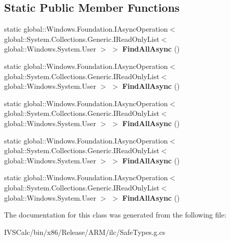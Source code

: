 \subsection*{Static Public Member Functions}
\begin{DoxyCompactItemize}
\item 
\mbox{\label{class_windows_1_1_system_1_1_user_a5108918689ee4c7c0de8959812335c4a}} 
static global\+::\+Windows.\+Foundation.\+I\+Async\+Operation$<$ global\+::\+System.\+Collections.\+Generic.\+I\+Read\+Only\+List$<$ global\+::\+Windows.\+System.\+User $>$ $>$ {\bfseries Find\+All\+Async} ()
\item 
\mbox{\label{class_windows_1_1_system_1_1_user_a5108918689ee4c7c0de8959812335c4a}} 
static global\+::\+Windows.\+Foundation.\+I\+Async\+Operation$<$ global\+::\+System.\+Collections.\+Generic.\+I\+Read\+Only\+List$<$ global\+::\+Windows.\+System.\+User $>$ $>$ {\bfseries Find\+All\+Async} ()
\item 
\mbox{\label{class_windows_1_1_system_1_1_user_a5108918689ee4c7c0de8959812335c4a}} 
static global\+::\+Windows.\+Foundation.\+I\+Async\+Operation$<$ global\+::\+System.\+Collections.\+Generic.\+I\+Read\+Only\+List$<$ global\+::\+Windows.\+System.\+User $>$ $>$ {\bfseries Find\+All\+Async} ()
\item 
\mbox{\label{class_windows_1_1_system_1_1_user_a5108918689ee4c7c0de8959812335c4a}} 
static global\+::\+Windows.\+Foundation.\+I\+Async\+Operation$<$ global\+::\+System.\+Collections.\+Generic.\+I\+Read\+Only\+List$<$ global\+::\+Windows.\+System.\+User $>$ $>$ {\bfseries Find\+All\+Async} ()
\item 
\mbox{\label{class_windows_1_1_system_1_1_user_a5108918689ee4c7c0de8959812335c4a}} 
static global\+::\+Windows.\+Foundation.\+I\+Async\+Operation$<$ global\+::\+System.\+Collections.\+Generic.\+I\+Read\+Only\+List$<$ global\+::\+Windows.\+System.\+User $>$ $>$ {\bfseries Find\+All\+Async} ()
\end{DoxyCompactItemize}


The documentation for this class was generated from the following file\+:\begin{DoxyCompactItemize}
\item 
I\+V\+S\+Calc/bin/x86/\+Release/\+A\+R\+M/ilc/Safe\+Types.\+g.\+cs\end{DoxyCompactItemize}
